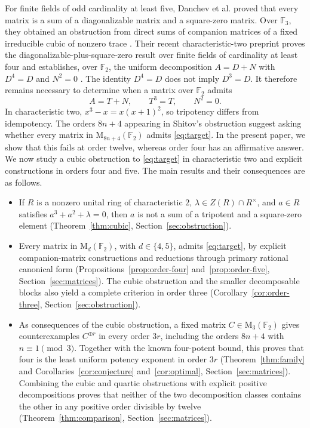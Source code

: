\documentclass[12pt]{amsart}
\theoremstyle{remark}
\numberwithin{equation}{section}
\theoremstyle{definition}
\newcommand{\F}{\mathbb F}
\newcommand{\Mat}{\mathrm M}
\begin{document}
For finite fields of odd cardinality at least five, Danchev et al. \cite[Theorem~2.2]{DGLOdd} proved that every matrix is a sum of a diagonalizable matrix and a square-zero matrix. Over $\F_3$, they obtained an obstruction from direct sums of companion matrices of a fixed irreducible cubic of nonzero trace \cite[Proposition~3.6]{DGLOdd}. Their recent characteristic-two preprint proves the diagonalizable-plus-square-zero result over finite fields of cardinality at least four and establishes, over $\F_2$, the uniform decomposition $A=D+N$ with $D^4=D$ and $N^2=0$ \cite[Theorem~3.1 and Corollary~3.3]{DGLEven}. The identity $D^4=D$ does not imply $D^3=D$. It therefore remains necessary to determine when a matrix over $\F_2$ admits
\begin{equation}\label{eq:target}
 A=T+N,\qquad T^3=T,\qquad N^2=0.
\end{equation}
In characteristic two, $x^3-x=x(x+1)^2$, so tripotency differs from idempotency. The orders $8n+4$ appearing in Shitov's obstruction suggest asking whether every matrix in $\Mat_{8n+4}(\F_2)$ admits \eqref{eq:target}. In the present paper, we show that this fails at order twelve, whereas order four has an affirmative answer. We now study a cubic obstruction to \eqref{eq:target} in characteristic two and explicit constructions in orders four and five. The main results and their consequences are as follows.
\begin{itemize}
\item[$\bullet$] If $R$ is a nonzero unital ring of characteristic $2$, $\lambda\in Z(R)\cap R^\times$, and $a\in R$ satisfies $a^3+a^2+\lambda=0$, then $a$ is not a sum of a tripotent and a square-zero element (Theorem~\ref{thm:cubic}, Section~\ref{sec:obstruction}).

\item[$\bullet$] Every matrix in $\Mat_d(\F_2)$, with $d\in\{4,5\}$, admits \eqref{eq:target}, by explicit companion-matrix constructions and reductions through primary rational canonical form (Propositions~\ref{prop:order-four} and~\ref{prop:order-five}, Section~\ref{sec:matrices}). The cubic obstruction and the smaller decomposable blocks also yield a complete criterion in order three (Corollary~\ref{cor:order-three}, Section~\ref{sec:obstruction}).

\item[$\bullet$] As consequences of the cubic obstruction, a fixed matrix $C\in\Mat_3(\F_2)$ gives counterexamples $C^{\oplus r}$ in every order $3r$, including the orders $8n+4$ with $n\equiv1\pmod3$. Together with the known four-potent bound, this proves that four is the least uniform potency exponent in order $3r$ (Theorem~\ref{thm:family} and Corollaries~\ref{cor:conjecture} and~\ref{cor:optimal}, Section~\ref{sec:matrices}). Combining the cubic and quartic obstructions with explicit positive decompositions proves that neither of the two decomposition classes contains the other in any positive order divisible by twelve (Theorem~\ref{thm:comparison}, Section~\ref{sec:matrices}).
\end{itemize}
\end{document}
